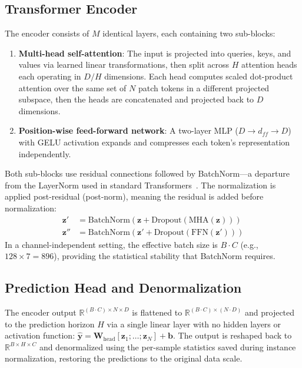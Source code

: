 \documentclass[11pt]{article}
\begin{document}
\subsection{Transformer Encoder}

The encoder consists of $M$ identical layers, each containing two sub-blocks:
\begin{enumerate}
    \item \textbf{Multi-head self-attention}: The input is projected into queries, keys, and values via learned linear transformations, then split across $H$ attention heads each operating in $D/H$ dimensions. Each head computes scaled dot-product attention over the same set of $N$ patch tokens in a different projected subspace, then the heads are concatenated and projected back to $D$ dimensions.
    \item \textbf{Position-wise feed-forward network}: A two-layer MLP ($D \to d_{ff} \to D$) with GELU activation expands and compresses each token's representation independently.
\end{enumerate}
Both sub-blocks use residual connections followed by BatchNorm---a departure from the LayerNorm used in standard Transformers~\cite{vaswani2017}. The normalization is applied post-residual (post-norm), meaning the residual is added before normalization:
\begin{align}
    \mathbf{z}' &= \text{BatchNorm}(\mathbf{z} + \text{Dropout}(\text{MHA}(\mathbf{z}))) \\
    \mathbf{z}'' &= \text{BatchNorm}(\mathbf{z}' + \text{Dropout}(\text{FFN}(\mathbf{z}')))
\end{align}
In a channel-independent setting, the effective batch size is $B \cdot C$ (e.g., $128 \times 7 = 896$), providing the statistical stability that BatchNorm requires.

\subsection{Prediction Head and Denormalization}

The encoder output $\mathbb{R}^{(B \cdot C) \times N \times D}$ is flattened to $\mathbb{R}^{(B \cdot C) \times (N \cdot D)}$ and projected to the prediction horizon $H$ via a single linear layer with no hidden layers or activation function: $\hat{\mathbf{y}} = \mathbf{W}_{\text{head}} [\mathbf{z}_1; \ldots; \mathbf{z}_N] + \mathbf{b}$. The output is reshaped back to $\mathbb{R}^{B \times H \times C}$ and denormalized using the per-sample statistics saved during instance normalization, restoring the predictions to the original data scale.
\end{document}
